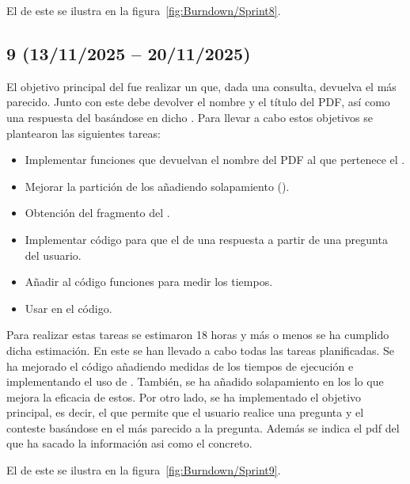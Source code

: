 El  de este  se ilustra en la figura~\ref{fig:Burndown/Sprint8}.

\subsection{ 9 (13/11/2025 -- 20/11/2025)}
El objetivo principal del  fue realizar un  que, dada una consulta, devuelva el  más parecido. Junto con este  debe devolver el nombre y el título del PDF, así como una respuesta del  basándose en dicho . Para llevar a cabo estos objetivos se plantearon las siguientes tareas:
\begin{itemize}
\tightlist
	\item Implementar funciones que devuelvan el nombre del PDF al que pertenece el .
	\item Mejorar la partición de los  añadiendo solapamiento ().
	\item Obtención del fragmento del .
	\item Implementar código para que el  de una respuesta a partir de una pregunta del usuario.
	\item Añadir al código funciones para medir los tiempos.
	\item Usar  en el código.
\end{itemize}

Para realizar estas tareas se estimaron 18 horas y más o menos se ha cumplido dicha estimación. En este  se han llevado a cabo todas las tareas planificadas. Se ha mejorado el código añadiendo medidas de los tiempos de ejecución e implementando el uso de . También, se ha añadido solapamiento en los  lo que mejora la eficacia de estos. Por otro lado, se ha implementado el objetivo principal, es decir, el  que permite que el usuario realice una pregunta y el  conteste basándose en el  más parecido a la pregunta. Además se indica el pdf del que ha sacado la información asi como el  concreto.

El  de este  se ilustra en la figura~\ref{fig:Burndown/Sprint9}.

